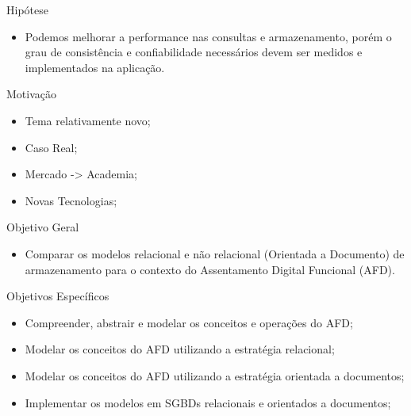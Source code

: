 \begin{frame}{Hipótese}
    \begin{itemize}
           \item Podemos melhorar a performance nas consultas e armazenamento, porém o grau de consistência e confiabilidade necessários devem ser medidos e implementados na aplicação.
    \end{itemize}
\end{frame}


\begin{frame}{Motivação}
    \begin{itemize}
    \item Tema relativamente novo;
    \item Caso Real;
    \item Mercado -> Academia;
    \item Novas Tecnologias;
    \end{itemize}
\end{frame}


\begin{frame}{Objetivo Geral}
    \begin{itemize}
    \item Comparar os modelos relacional e não relacional (Orientada a Documento) de armazenamento  para o contexto do Assentamento Digital Funcional (AFD).
    \end{itemize}
\end{frame}


\begin{frame}{Objetivos Específicos}
    \begin{itemize}
    \item Compreender, abstrair e modelar os conceitos e operações do AFD;
    \item Modelar os conceitos do AFD utilizando a estratégia relacional;
    \item Modelar os conceitos do AFD utilizando a estratégia orientada a documentos;
    \item Implementar os modelos em SGBDs relacionais e orientados a documentos;
    \end{itemize}
\end{frame}

